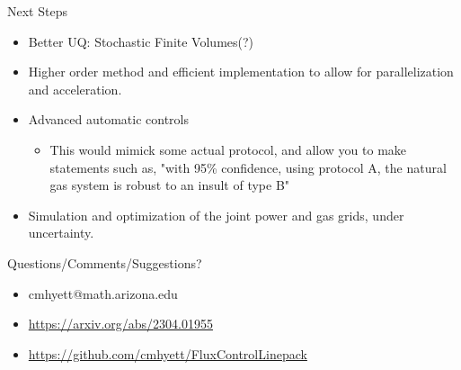 \begin{frame}{Next Steps}
  \begin{itemize}
  \item Better UQ: Stochastic Finite Volumes(?)
  \item Higher order method and efficient implementation to allow for parallelization and acceleration.
  \item Advanced automatic controls
    \begin{itemize}
    \item This would mimick some actual protocol, and allow you to make statements such as, "with 95\% confidence, using protocol A, the natural gas system is robust to an insult of type B"
    \end{itemize}
  \item Simulation and optimization of the joint power and gas grids, under uncertainty.
  \end{itemize}
\end{frame}

\begin{frame}{Questions/Comments/Suggestions?}
  \begin{itemize}
  \item cmhyett@math.arizona.edu
  \item \url{https://arxiv.org/abs/2304.01955}
  \item \url{https://github.com/cmhyett/FluxControlLinepack}
  \end{itemize}  
\end{frame}
